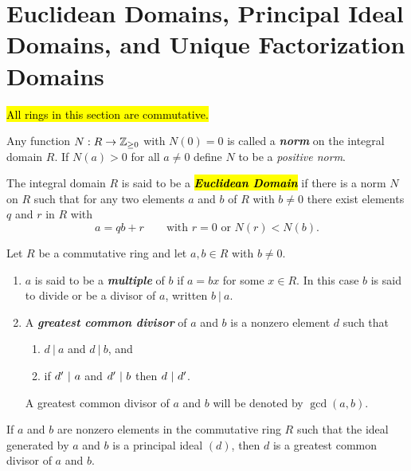 \section{Euclidean Domains, Principal Ideal Domains, and Unique Factorization Domains}

\hl{All rings in this section are commutative.}

\nl

\begin{defn}
Any function $N:R\rightarrow \mathbb{Z}_{\geq 0}$ with $N(0) = 0$ is called a \textit{\textbf{norm}} on the integral domain $R$. If $N(a)> 0$ for all $a\neq 0$ define $N$ to be a \textit{positive norm}.
\end{defn}

\nl

\begin{defn}
The integral domain $R$ is said to be a \hl{\textit{\textbf{Euclidean Domain}}} if there is a norm $N$ on $R$ such that for any two elements $a$ and $b$ of $R$ with $b\neq 0$ there exist elements $q$ and $r$ in $R$ with 
\[a = qb + r\qquad \text{with } r = 0 \text{ or } N(r)<N(b).\]
\end{defn}

\nl

\begin{defn}
Let $R$ be a commutative ring and let $a,b\in R$ with $b\neq 0$.
\begin{enumerate}
\item $a$ is said to be a \textbf{\textit{multiple}} of $b$ if $a = bx$ for some $x\in R$. In this case $b$ is said to divide or be a divisor of $a$, written $b\ |\ a$.
\item A \textbf{\textit{greatest common divisor}} of $a$ and $b$ is a nonzero element $d$ such that 
\begin{enumerate}
\item $d\ |\ a$ and $d\ |\ b$, and 
\item if $d^\prime\ |\ a$ and $d^\prime\ |\ b$ then $d\ |\ d^\prime$.
\end{enumerate}
A greatest common divisor of $a$ and $b$ will be denoted by $\gcd(a,b)$.
\end{enumerate}
\end{defn}

\nl

\begin{prop}
If $a$ and $b$ are nonzero elements in the commutative ring $R$ such that the ideal generated by $a$ and $b$ is a principal ideal $(d)$, then $d$ is a greatest common divisor of $a$ and $b$.
\end{prop}

